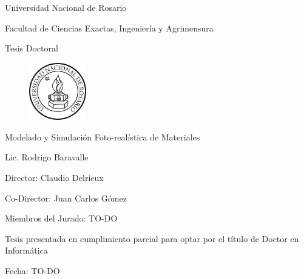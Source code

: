
\begin{titlepage}
\begin{center}

Universidad Nacional de Rosario

Facultad de Ciencias Exactas, Ingeniería y Agrimensura

Tesis Doctoral

\begin{figure}[h!]
\centering
\includegraphics[width=2.5cm]{figures/logounr}
\end{figure}

\vspace{2cm}


{\huge Modelado y Simulación Foto-realística de Materiales}
\vspace{2cm}

{\large Lic. Rodrigo Baravalle}
\vspace{2cm}

{\large Director: Claudio Delrieux}

{\large Co-Director: Juan Carlos Gómez}

\vspace{2cm}
{\large Miembros del Jurado: TO-DO}

\vspace{2cm}
{\large Tesis presentada en cumplimiento parcial para optar por el título de Doctor en Informática}

\vspace{1cm}
Fecha: TO-DO
\end{center}
\end{titlepage}

